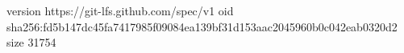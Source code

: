 version https://git-lfs.github.com/spec/v1
oid sha256:fd5b147dc45fa7417985f09084ea139bf31d153aac2045960b0c042eab0320d2
size 31754
